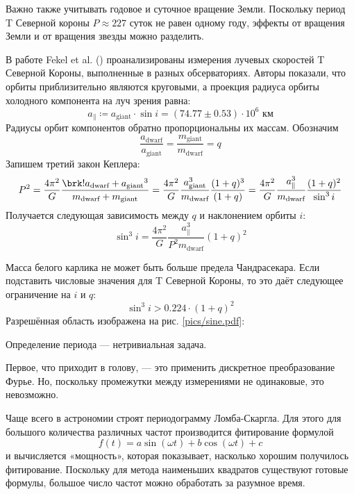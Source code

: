 Важно также учитывать годовое и суточное вращение Земли. Поскольку период T Северной короны $P \approx 227$ суток не равен одному году, эффекты от вращения Земли и от вращения звезды можно разделить.



В работе Fekel et al. (\citeyear{RadialVelocities}) проанализированы измерения лучевых скоростей T Северной Короны, выполненные в разных обсерваториях. Авторы показали, что орбиты приблизительно являются круговыми, а проекция радиуса орбиты холодного компонента на луч зрения равна:
\[
a_\| \coloneq a_\text{giant} \cdot \sin i = (74.77 \pm 0.53) \cdot 10^6 \text{ км}
\]
%
%
Радиусы орбит компонентов обратно пропорциональны их массам. Обозначим
\[
\frac{a_\text{dwarf}}{a_\text{giant}} = \frac{m_\text{giant}}{m_\text{dwarf}} = q
\]
Запишем третий закон Кеплера:
\[
P^2 = \frac{4\pi^2}{G} \frac{\brk!{a_\text{dwarf} + a_\text{giant}}^3}{m_\text{dwarf} + m_\text{giant}}
= \frac{4\pi^2}{G} \frac{a_\text{giant}^3}{m_\text{dwarf}} \frac{(1 + q)^3}{(1 + q)}
= \frac{4\pi^2}{G} \frac{a_\|^3}{m_\text{dwarf}} \frac{(1 + q)^2}{\sin^3 i}
\]
Получается следующая зависимость между $q$ и наклонением орбиты $i$:
\[
\sin^3 i = \frac{4\pi^2}{G} \frac{a_\|^3}{P^2 m_\text{dwarf}} (1 + q)^2
\]


Масса белого карлика не может быть больше предела Чандрасекара. Если подставить числовые значения для T Северной Короны, то это даёт следующее ограничение на $i$ и $q$:
\[
\sin^3 i > 0.224 \cdot (1 + q)^2
\]
Разрешённая область изображена на рис. \ref{pics/sine.pdf}:




Определение периода --- нетривиальная задача.

Первое, что приходит в голову, --- это применить дискретное преобразование Фурье. Но, поскольку промежутки между измерениями не одинаковые, это невозможно.

Чаще всего в астрономии строят периодограмму Ломба-Скаргла. Для этого для большого количества различных частот производится фитирование формулой
\[
f(t) = a \sin(\omega t) + b \cos(\omega t) + c
\]
и вычисляется «мощность», которая показывает, насколько хорошим получилось фитирование. Поскольку для метода наименьших квадратов существуют готовые формулы, большое число частот можно обработать за разумное время.

